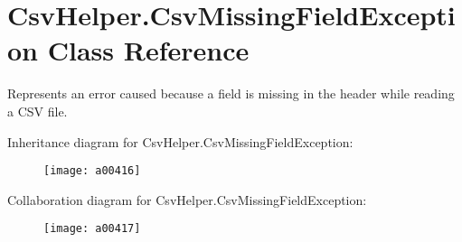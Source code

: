 \hypertarget{a00061}{\section{Csv\-Helper.\-Csv\-Missing\-Field\-Exception Class Reference}
\label{a00061}
}


Represents an error caused because a field is missing in the header while reading a C\-S\-V file.  




Inheritance diagram for Csv\-Helper.\-Csv\-Missing\-Field\-Exception\-:
\nopagebreak
\begin{figure}[H]
\begin{center}
\leavevmode
\texttt{[image: a00416]}
\end{center}
\end{figure}


Collaboration diagram for Csv\-Helper.\-Csv\-Missing\-Field\-Exception\-:
\nopagebreak
\begin{figure}[H]
\begin{center}
\leavevmode
\texttt{[image: a00417]}
\end{center}
\end{figure}
